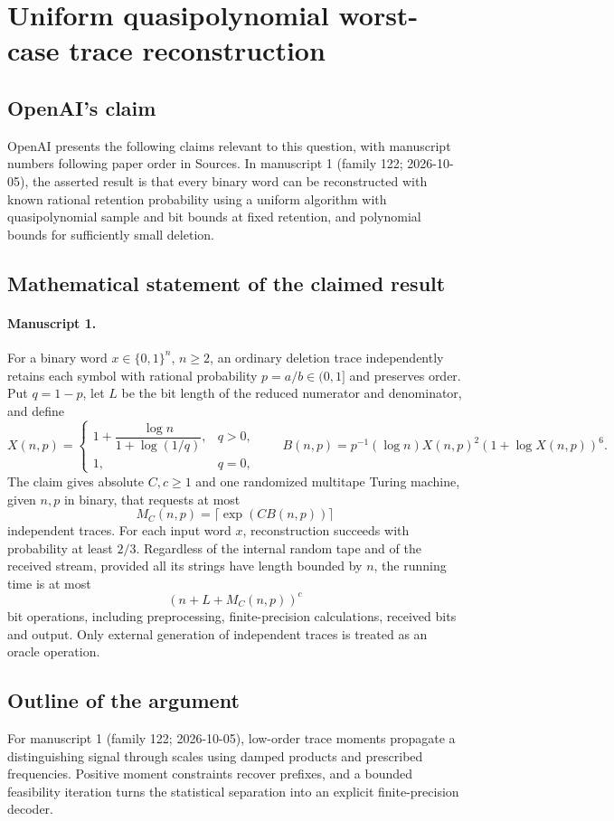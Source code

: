 \documentclass[11pt]{article}
\begin{document}
\section*{Uniform quasipolynomial worst-case trace reconstruction}

\subsection{OpenAI's claim}
OpenAI presents the following claims relevant to this question, with manuscript numbers following paper order in Sources. In manuscript 1 (family 122; 2026-10-05), the asserted result is that every binary word can be reconstructed with known rational retention probability using a uniform algorithm with quasipolynomial sample and bit bounds at fixed retention, and polynomial bounds for sufficiently small deletion.

\subsection{Mathematical statement of the claimed result}
\paragraph{Manuscript 1.}
For a binary word $x\in\{0,1\}^n$, $n\ge2$, an ordinary deletion trace independently retains each symbol with rational probability $p=a/b\in(0,1]$ and preserves order. Put $q=1-p$, let $L$ be the bit length of the reduced numerator and denominator, and define
\[
 X(n,p)=\begin{cases}1+\dfrac{\log n}{1+\log(1/q)},&q>0,\\1,&q=0,\end{cases}
 \qquad B(n,p)=p^{-1}(\log n)X(n,p)^2(1+\log X(n,p))^6.
\]
The claim gives absolute $C,c\ge1$ and one randomized multitape Turing machine, given $n,p$ in binary, that requests at most
\[
 M_C(n,p)=\lceil\exp(CB(n,p))\rceil
\]
independent traces. For each input word $x$, reconstruction succeeds with probability at least $2/3$. Regardless of the internal random tape and of the received stream, provided all its strings have length bounded by $n$, the running time is at most
\[
 (n+L+M_C(n,p))^c
\]
bit operations, including preprocessing, finite-precision calculations, received bits and output. Only external generation of independent traces is treated as an oracle operation.

\subsection{Outline of the argument}
For manuscript 1 (family 122; 2026-10-05), low-order trace moments propagate a distinguishing signal through scales using damped products and prescribed frequencies. Positive moment constraints recover prefixes, and a bounded feasibility iteration turns the statistical separation into an explicit finite-precision decoder.
\end{document}
